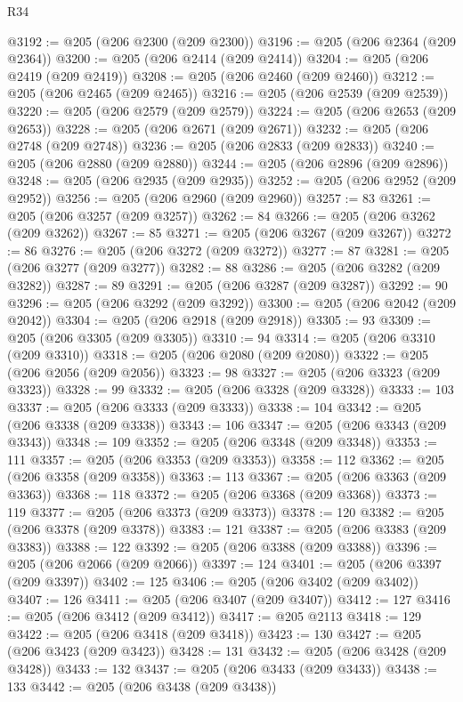 \begin{lexlean}{R34}
\begin{coremodule}
@3192 := @205 (@206 @2300 (@209 @2300))
@3196 := @205 (@206 @2364 (@209 @2364))
@3200 := @205 (@206 @2414 (@209 @2414))
@3204 := @205 (@206 @2419 (@209 @2419))
@3208 := @205 (@206 @2460 (@209 @2460))
@3212 := @205 (@206 @2465 (@209 @2465))
@3216 := @205 (@206 @2539 (@209 @2539))
@3220 := @205 (@206 @2579 (@209 @2579))
@3224 := @205 (@206 @2653 (@209 @2653))
@3228 := @205 (@206 @2671 (@209 @2671))
@3232 := @205 (@206 @2748 (@209 @2748))
@3236 := @205 (@206 @2833 (@209 @2833))
@3240 := @205 (@206 @2880 (@209 @2880))
@3244 := @205 (@206 @2896 (@209 @2896))
@3248 := @205 (@206 @2935 (@209 @2935))
@3252 := @205 (@206 @2952 (@209 @2952))
@3256 := @205 (@206 @2960 (@209 @2960))
@3257 := 83
@3261 := @205 (@206 @3257 (@209 @3257))
@3262 := 84
@3266 := @205 (@206 @3262 (@209 @3262))
@3267 := 85
@3271 := @205 (@206 @3267 (@209 @3267))
@3272 := 86
@3276 := @205 (@206 @3272 (@209 @3272))
@3277 := 87
@3281 := @205 (@206 @3277 (@209 @3277))
@3282 := 88
@3286 := @205 (@206 @3282 (@209 @3282))
@3287 := 89
@3291 := @205 (@206 @3287 (@209 @3287))
@3292 := 90
@3296 := @205 (@206 @3292 (@209 @3292))
@3300 := @205 (@206 @2042 (@209 @2042))
@3304 := @205 (@206 @2918 (@209 @2918))
@3305 := 93
@3309 := @205 (@206 @3305 (@209 @3305))
@3310 := 94
@3314 := @205 (@206 @3310 (@209 @3310))
@3318 := @205 (@206 @2080 (@209 @2080))
@3322 := @205 (@206 @2056 (@209 @2056))
@3323 := 98
@3327 := @205 (@206 @3323 (@209 @3323))
@3328 := 99
@3332 := @205 (@206 @3328 (@209 @3328))
@3333 := 103
@3337 := @205 (@206 @3333 (@209 @3333))
@3338 := 104
@3342 := @205 (@206 @3338 (@209 @3338))
@3343 := 106
@3347 := @205 (@206 @3343 (@209 @3343))
@3348 := 109
@3352 := @205 (@206 @3348 (@209 @3348))
@3353 := 111
@3357 := @205 (@206 @3353 (@209 @3353))
@3358 := 112
@3362 := @205 (@206 @3358 (@209 @3358))
@3363 := 113
@3367 := @205 (@206 @3363 (@209 @3363))
@3368 := 118
@3372 := @205 (@206 @3368 (@209 @3368))
@3373 := 119
@3377 := @205 (@206 @3373 (@209 @3373))
@3378 := 120
@3382 := @205 (@206 @3378 (@209 @3378))
@3383 := 121
@3387 := @205 (@206 @3383 (@209 @3383))
@3388 := 122
@3392 := @205 (@206 @3388 (@209 @3388))
@3396 := @205 (@206 @2066 (@209 @2066))
@3397 := 124
@3401 := @205 (@206 @3397 (@209 @3397))
@3402 := 125
@3406 := @205 (@206 @3402 (@209 @3402))
@3407 := 126
@3411 := @205 (@206 @3407 (@209 @3407))
@3412 := 127
@3416 := @205 (@206 @3412 (@209 @3412))
@3417 := @205 @2113
@3418 := 129
@3422 := @205 (@206 @3418 (@209 @3418))
@3423 := 130
@3427 := @205 (@206 @3423 (@209 @3423))
@3428 := 131
@3432 := @205 (@206 @3428 (@209 @3428))
@3433 := 132
@3437 := @205 (@206 @3433 (@209 @3433))
@3438 := 133
@3442 := @205 (@206 @3438 (@209 @3438))

\end{coremodule}
\end{lexlean}
